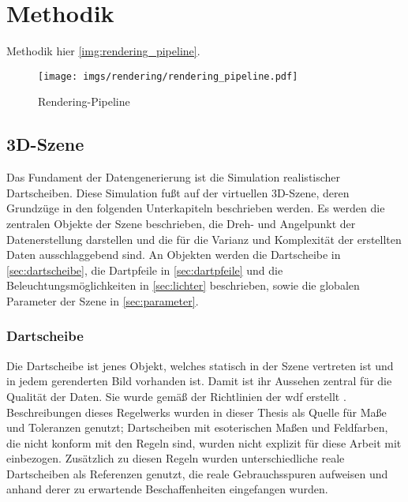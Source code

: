 
\section{Methodik}
\label{sec:daten:methodik}

Methodik hier \autoref{img:rendering_pipeline}.


\begin{figure}
    \centering
    \texttt{[image: imgs/rendering/rendering\_pipeline.pdf]}
    \caption{Rendering-Pipeline}
    \label{img:rendering_pipeline}
\end{figure}

\subsection{3D-Szene} %

Das Fundament der Datengenerierung ist die Simulation realistischer Dartscheiben. Diese Simulation fußt auf der virtuellen 3D-Szene, deren Grundzüge in den folgenden Unterkapiteln beschrieben werden. Es werden die zentralen Objekte der Szene beschrieben, die Dreh- und Angelpunkt der Datenerstellung darstellen und die für die Varianz und Komplexität der erstellten Daten ausschlaggebend sind. An Objekten werden die Dartscheibe in \autoref{sec:dartscheibe}, die Dartpfeile in \autoref{sec:dartpfeile} und die Beleuchtungsmöglichkeiten in \autoref{sec:lichter} beschrieben, sowie die globalen Parameter der Szene in \autoref{sec:parameter}.

\subsubsection{Dartscheibe}
\label{sec:dartscheibe}

Die Dartscheibe ist jenes Objekt, welches statisch in der Szene vertreten ist und in jedem gerenderten Bild vorhanden ist. Damit ist ihr Aussehen zentral für die Qualität der Daten. Sie wurde gemäß der Richtlinien  der \ac{wdf} erstellt \cite{wdf-rules}. Beschreibungen dieses Regelwerks wurden in dieser Thesis als Quelle für Maße und Toleranzen genutzt; Dartscheiben mit esoterischen Maßen und Feldfarben, die nicht konform mit den Regeln sind, wurden nicht explizit für diese Arbeit mit einbezogen. Zusätzlich zu diesen Regeln wurden unterschiedliche reale Dartscheiben als Referenzen genutzt, die reale Gebrauchsspuren aufweisen und anhand derer zu erwartende Beschaffenheiten eingefangen wurden.

